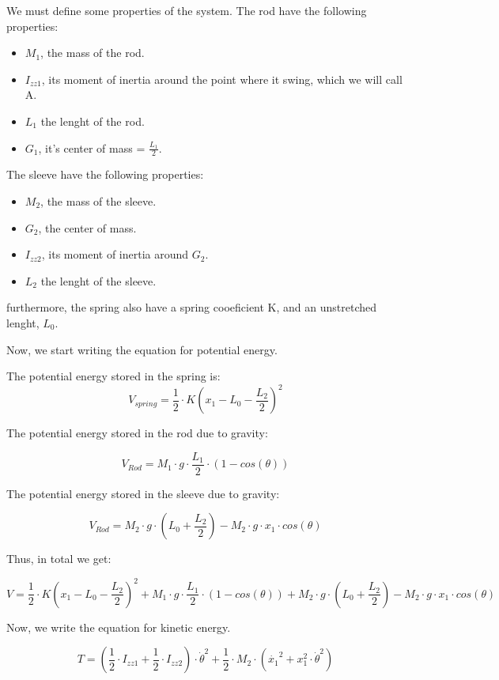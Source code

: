 \documentclass[a4paper,12pt,english]{article}
\begin{document}
We must define some properties of the system. The rod have the following properties:
\begin{itemize}
	\item $M_1$, the mass of the rod.
	\item $I_{zz1}$, its moment of inertia around the point where it swing, which we will call A.
	\item $L_1$ the lenght of the rod.
	\item $G_1$, it's center of mass = $\frac{L_1}{2}$.
\end{itemize}



The sleeve have the following properties:
\begin{itemize}
	\item $M_2$, the mass of the sleeve.
	\item $G_2$, the center of mass.
	\item $I_{zz2}$, its moment of inertia around $G_2$.
	\item $L_2$ the lenght of the sleeve.
\end{itemize}

furthermore, the spring also have a spring cooeficient K, and an unstretched lenght, $L_0$.


Now, we start writing the equation for potential energy.

The potential energy stored in the spring is:
$$V_{spring} = \frac{1}{2} \cdot K \left (x_1 - L_0 - \frac{L_2}{2} \right)^2$$

The potential energy stored in the rod due to gravity:

$$V_{Rod} =  M_1 \cdot g \cdot \frac{L_1}{2} \cdot \left (1 - cos (\theta) \right )$$

The potential energy stored in the sleeve due to gravity:

$$V_{Rod} =  M_2 \cdot g \cdot \left( L_0 + \frac{L_2}{2} \right) - M_2 \cdot g \cdot x_1 \cdot cos(\theta) $$

Thus, in total we get:

$$V= \frac{1}{2} \cdot K \left (x_1 - L_0 - \frac{L_2}{2} \right)^2 + M_1 \cdot g \cdot \frac{L_1}{2} \cdot \left (1 - cos (\theta) \right ) +  M_2 \cdot g \cdot \left( L_0 + \frac{L_2}{2} \right) - M_2 \cdot g \cdot x_1 \cdot cos(\theta)$$

Now, we write the equation for kinetic energy.

$$T = \left ( \frac{1}{2} \cdot I_{zz1} + \frac{1}{2} \cdot  I_{zz2}   \right) \cdot \dot{\theta}^2 + \frac{1}{2} \cdot M_2 \cdot \left( \dot{x_1}^2 + x_1^2 \cdot \dot{\theta}^2 \right )$$ 
\end{document}
